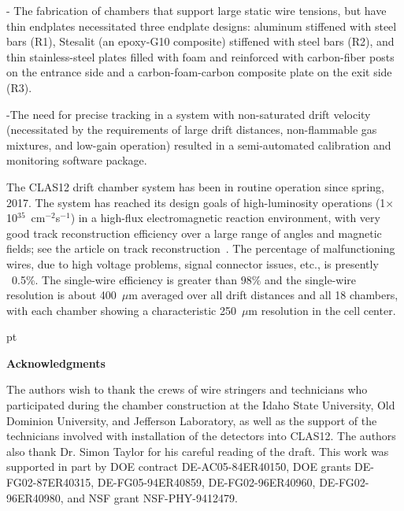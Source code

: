 \noindent
- The fabrication of chambers that support large static wire tensions, but have thin 
endplates necessitated three endplate designs: aluminum stiffened with steel bars (R1),
Stesalit (an epoxy-G10 composite) stiffened with steel bars (R2), and thin stainless-steel 
plates filled with foam and reinforced
with carbon-fiber posts on the entrance side and a carbon-foam-carbon composite plate on the exit side (R3). 

\noindent
-The need for precise tracking in a system with non-saturated drift velocity 
(necessitated by the requirements of large drift distances, non-flammable gas mixtures, 
and low-gain operation) resulted in a semi-automated calibration and monitoring software 
package.

\vskip 10pt
The CLAS12 drift chamber system has been in routine operation since spring, 2017. 
The system has reached its design goals of high-luminosity operations
(1$\times$10$^{35}$~cm$^{-2}$s$^{-1}$) in a high-flux electromagnetic reaction
environment, with very good track reconstruction efficiency over a large range of angles and 
magnetic fields; see the article on track reconstruction~\cite{recon-nim}.  
The percentage of malfunctioning wires, due to high voltage problems, signal
connector issues, etc., is presently ~0.5\%.
The single-wire efficiency is greater than $98\%$ and the
single-wire resolution is about 400~$\mu$m averaged over all drift distances and
all 18 chambers, with each chamber showing a characteristic 250~$\mu$m resolution 
in the cell center.

 pt

{\large{\bf Acknowledgments}}

\vskip 10pt

The authors wish to thank the crews of wire stringers and technicians who 
participated during the chamber construction at the Idaho State University,
Old Dominion University, and Jefferson Laboratory, as well as the support of 
the technicians involved with installation of the detectors into CLAS12.  The
authors also thank Dr. Simon Taylor for his careful reading of the draft.  This
work was supported in part by DOE contract DE-AC05-84ER40150, DOE grants 
DE-FG02-87ER40315, DE-FG05-94ER40859, DE-FG02-96ER40960, DE-FG02-96ER40980, 
and NSF grant NSF-PHY-9412479.




